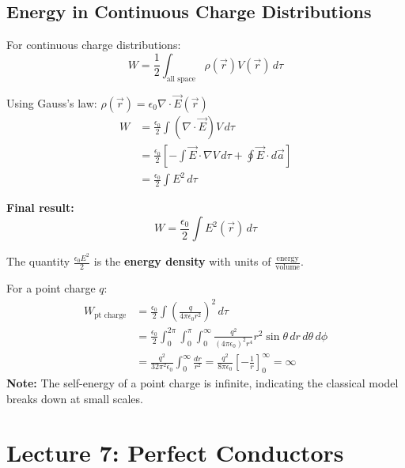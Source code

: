 \documentclass{article}
\begin{document}
\subsection{Energy in Continuous Charge Distributions}
For continuous charge distributions:
\begin{equation}
    W = \frac{1}{2} \int_{\text{all space}} \rho(\vec{r}) V(\vec{r}) \, d\tau
\end{equation}

Using Gauss's law: $\rho(\vec{r}) = \epsilon_0 \nabla \cdot \vec{E}(\vec{r})$
\begin{align}
    W &= \frac{\epsilon_0}{2} \int (\nabla \cdot \vec{E}) V \, d\tau \\
    &= \frac{\epsilon_0}{2} \left[ -\int \vec{E} \cdot \nabla V \, d\tau + \oint \vec{E} \cdot d\vec{a} \right] \\
    &= \frac{\epsilon_0}{2} \int E^2 \, d\tau
\end{align}

\textbf{Final result:}
\begin{equation}
    W = \frac{\epsilon_0}{2} \int E^2(\vec{r}) \, d\tau
\end{equation}

The quantity $\frac{\epsilon_0 E^2}{2}$ is the \textbf{energy density} with units of $\frac{\text{energy}}{\text{volume}}$.

For a point charge $q$:
\begin{align}
    W_{\text{pt charge}} &= \frac{\epsilon_0}{2} \int \left(\frac{q}{4\pi\epsilon_0 r^2}\right)^2 \, d\tau \\
    &= \frac{\epsilon_0}{2} \int_0^{2\pi} \int_0^{\pi} \int_0^{\infty} \frac{q^2}{(4\pi\epsilon_0)^2 r^4} r^2 \sin\theta \, dr \, d\theta \, d\phi \\
    &= \frac{q^2}{32\pi^2\epsilon_0} \int_0^{\infty} \frac{dr}{r^2} = \frac{q^2}{8\pi\epsilon_0} \left[-\frac{1}{r}\right]_0^{\infty} = \infty
\end{align}
\textbf{Note:} The self-energy of a point charge is infinite, indicating the classical model breaks down at small scales.


\newpage
\section{Lecture 7: Perfect Conductors}
\end{document}
